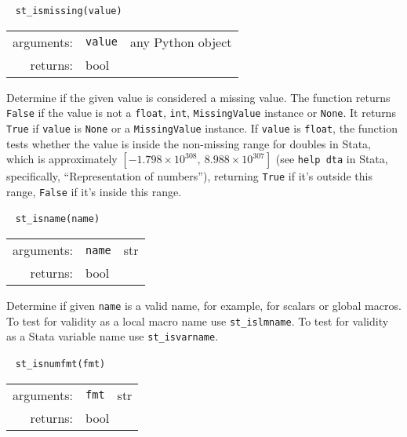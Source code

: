 \documentclass{article}
\begin{document}
			
			\ \newline
			\noindent \lstinline$st_ismissing(value)$
								
			\vspace{1.5mm}
			\noindent 
			\indent \begin{tabular}{rrl}
					arguments: & \texttt{value} & any Python object \\
					returns: & \multicolumn{2}{l}{bool}
				\end{tabular}
								
			\vspace{1.5mm}
			\noindent Determine if the given value is considered a missing value. The function returns \lstinline{False} if the value is not a \lstinline{float}, \lstinline{int}, \lstinline{MissingValue} instance or \lstinline{None}. It returns \lstinline{True} if \lstinline{value} is \lstinline{None} or a \lstinline{MissingValue} instance. If \lstinline{value} is \lstinline{float}, the function tests whether the value is inside the non-missing range for doubles in Stata, which is approximately $[-1.798 \times 10^{308},\ 8.988 \times 10^{307}]$ (see \lstinline{help dta} in Stata, specifically, ``Representation of numbers''), returning \lstinline{True} if it's outside this range, \lstinline{False} if it's inside this range. \newline
		
			
			\ \newline
			\noindent \lstinline$st_isname(name)$
								
			\vspace{1.5mm}
			\noindent 
			\indent \begin{tabular}{rrl}
					arguments: & \texttt{name} & str \\
					returns: & \multicolumn{2}{l}{bool}
				\end{tabular}
								
			\vspace{1.5mm}
			\noindent Determine if given \lstinline{name} is a valid name, for example, for scalars or global macros. To test for validity as a local macro name use \lstinline$st_islmname$. To test for validity as a Stata variable name use \lstinline$st_isvarname$. \newline
			
			
			\ \newline
			\noindent \lstinline$st_isnumfmt(fmt)$
								
			\vspace{1.5mm}
			\noindent 
			\indent \begin{tabular}{rrl}
					arguments: & \texttt{fmt} & str \\
					returns: & \multicolumn{2}{l}{bool}
				\end{tabular}
								
\end{document}
